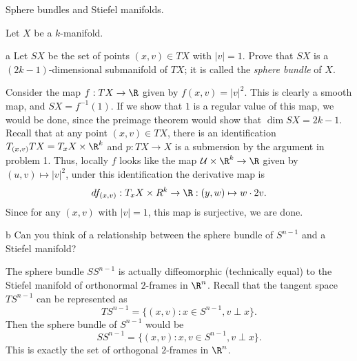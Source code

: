 \documentclass[11pt,letterpaper]{article}
\begin{document}
\begin{problem}
    Sphere bundles and Stiefel manifolds.
\end{problem}

\begin{solution}
    Let $X$ be a $k$-manifold.
    \begin{partproblem}{a}
        Let $SX$ be the set of points $(x,v)\in TX$ with $|v|=1$. Prove that $SX$ is a $(2k-1)$-dimensional submanifold of $TX$; it is called the \emph{sphere bundle} of $X$.
    \end{partproblem}

    \quad Consider the map $f : TX \to \R$ given by $f(x,v)=|v|^2$. This is clearly a smooth map, and $SX=f^{-1}(1)$. If we show that $1$ is a regular value of this map, we would be done, since the preimage theorem would show that $\dim SX = 2k-1$. Recall that at any point $(x,v)\in TX$, there is an identification $T_{(x,v)}TX=T_xX\times \R^k$ and $p : TX \to X$ is a submersion by the argument in problem 1. Thus, locally $f$ looks like the map $\mathcal{U}\times \R^k \to \R$ given by $(u,v)\mapsto |v|^2$, under this identification the derivative map is
    \[
        df_{(x,v)} : T_xX\times R^k \to \R : (y,w) \mapsto w\cdot 2v
    .\] 
    Since for any $(x,v)$ with $|v|=1$, this map is surjective, we are done.

    \begin{partproblem}{b}
        Can you think of a relationship between the sphere bundle of $S^{n-1}$ and a Stiefel manifold?
    \end{partproblem}
    \quad The sphere bundle $SS^{n-1}$ is actually diffeomorphic (technically equal) to the Stiefel manifold of orthonormal $2$-frames in $\R^n$. Recall that the tangent space $TS^{n-1}$ can be represented as
    \[
        TS^{n-1} = \{(x,v) : x\in S^{n-1}, v\perp x\}
    .\]  
    Then the sphere bundle of $S^{n-1}$ would be
    \[
        SS^{n-1} = \{(x,v) : x,v\in S^{n-1}, v\perp x\}
    .\]  
    This is exactly the set of orthogonal $2$-frames in $\R^n$.
\end{solution}
\end{document}
